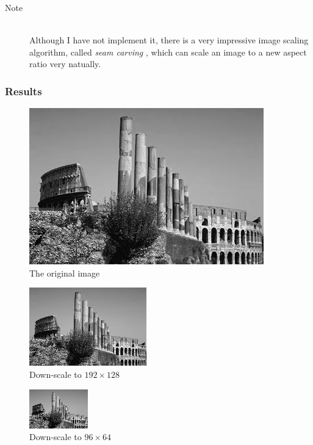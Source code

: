 \documentclass{article}
\begin{document}
\begin{description}
\item[Note] \hfill \\
Although I have not implement it, there is a very impressive image scaling algorithm, called \textit{seam carving} \cite{Avidan:2007:SCC:1275808.1276390}, which can scale an image to a new aspect ratio very natually.
\end{description}

\subsubsection{Results}
\label{sec:scaleresult}
\begin{figure}[H]
\centering
\includegraphics[width=288pt]{../img/02.png}
\caption{The original image}
\label{scaleorigin}
\end{figure}

\begin{figure}[H]
\centering
\includegraphics[width=144pt]{../result/scale-192-128.png}
\caption{Down-scale to $192 \times 128$}
\label{scale192}
\end{figure}

\begin{figure}[H]
\centering
\includegraphics[width=72pt]{../result/scale-96-64.png}
\caption{Down-scale to $96 \times 64$}
\label{scale96}
\end{figure}
\end{document}
